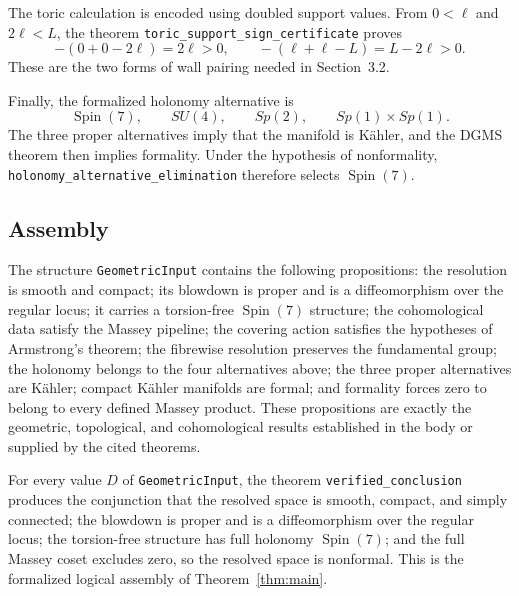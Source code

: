 \documentclass[11pt]{article}
\theoremstyle{remark}\newtheorem{remark}[theorem]{Remark}
\newcommand{\SpinSeven}{\operatorname{Spin}(7)}
\begin{document}
The toric calculation is encoded using doubled support values.  From
$0<\ell$ and $2\ell<L$, the theorem
\texttt{toric\_support\_sign\_certificate} proves
\[
 -(0+0-2\ell)=2\ell>0,
 \qquad
 -(\ell+\ell-L)=L-2\ell>0.
\]
These are the two forms of wall pairing needed in Section~3.2.

Finally, the formalized holonomy alternative is
\[
 \SpinSeven,\qquad SU(4),\qquad Sp(2),\qquad Sp(1)\times Sp(1).
\]
The three proper alternatives imply that the manifold is K\"ahler, and
the DGMS theorem then implies formality.  Under the hypothesis of
nonformality, \texttt{holonomy\_alternative\_elimination} therefore selects
$\SpinSeven$.

\subsection{Assembly}

The structure \texttt{GeometricInput} contains the following propositions:
the resolution is smooth and compact; its blowdown is proper and is a
diffeomorphism over the regular locus; it carries a torsion-free
$\SpinSeven$ structure; the cohomological data satisfy the Massey pipeline;
the covering action satisfies the hypotheses of Armstrong's theorem; the
fibrewise resolution preserves the fundamental group; the holonomy belongs
to the four alternatives above; the three proper alternatives are
K\"ahler; compact K\"ahler manifolds are formal; and formality forces zero
to belong to every defined Massey product.  These propositions are exactly
the geometric, topological, and cohomological results established in the
body or supplied by the cited theorems.

For every value $D$ of \texttt{GeometricInput}, the theorem
\texttt{verified\_conclusion} produces the conjunction that the resolved
space is smooth, compact, and simply connected; the blowdown is proper and
is a diffeomorphism over the regular locus; the torsion-free structure has
full holonomy $\SpinSeven$; and the full Massey coset excludes zero, so the
resolved space is nonformal.  This is the formalized logical assembly of
Theorem~\ref{thm:main}.
\end{document}
